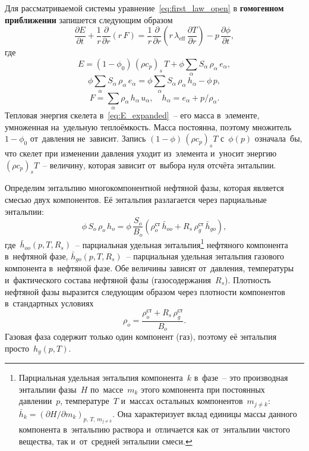 \documentclass[12pt,a4paper]{article}
\newcommand{\divr}[1]{\frac{1}{r}\frac{\partial}{\partial r}\!\left(r\,#1\right)}
\newcommand{\pdt}[1]{\frac{\partial #1}{\partial t}}
\newcommand{\pdr}[1]{\frac{\partial #1}{\partial r}}
\newcommand{\leff}{\lambda_{\mathrm{eff}}}
\begin{document}
Для рассматриваемой системы
уравнение~\eqref{eq:first_law_open} в \textbf{гомогенном приближении} запишется следующим образом
\begin{equation}\label{eq:energy_cons}
  \pdt{E}
  + \divr{F}
  = \divr{\leff\,\pdr{T}} - p\,\pdt{\phi},
\end{equation}
где
\begin{equation}\label{eq:E_expanded}
  E = (1 - \phi_0)\,(\rho c_p)_s\,T + \phi\sum_\alpha S_\alpha\,\rho_\alpha\,e_\alpha,
\end{equation}
\begin{equation}\label{eq:E_enthalpy_relation}
\phi\sum_\alpha S_\alpha\,\rho_\alpha\,e_\alpha = \phi\sum_\alpha S_\alpha\,\rho_\alpha\,h_\alpha
      - \phi\,p,
\end{equation}
\begin{equation}\label{eq:F_total}
  F = \sum_\alpha \rho_\alpha\,h_\alpha\,u_\alpha, \quad  h_\alpha = e_\alpha + p/\rho_\alpha.
\end{equation}
Тепловая энергия скелета в~\eqref{eq:E_expanded}~-- его масса
в~элементе, умноженная на~удельную теплоёмкость. Масса постоянна,
поэтому множитель $1 - \phi_0$ от~давления не~зависит. Запись
$(1 - \phi)\,(\rho c_p)_s T$ с~$\phi(p)$ означала~бы, что скелет при
изменении давления уходит из~элемента и~уносит энергию
$(\rho c_p)_s T$~-- величину, которая зависит от~выбора нуля отсчёта
энтальпии.

Определим энтальпию многокомпонентной нефтяной фазы, которая является смесью двух компонентов.
Её энтальпия разлагается через парциальные энтальпии:
\begin{equation}\label{eq:oil_enthalpy_components}
  \phi\,S_o\,\rho_o\,h_o
  = \phi\,\frac{S_o}{B_o}\!\left(
      \rho_o^{\text{ст}}\,\bar{h}_{oo}
      + R_s\,\rho_g^{\text{ст}}\,\bar{h}_{go}
    \right),
\end{equation}
где~$\bar{h}_{oo}(p, T, R_s)$~-- парциальная удельная
энтальпия\footnote{Парциальная удельная энтальпия компонента~$k$
в~фазе~-- это производная энтальпии фазы~$H$ по~массе~$m_k$ этого
компонента при постоянных давлении~$p$, температуре~$T$ и~массах
остальных компонентов~$m_{j\neq k}$:
$\bar{h}_k = (\partial H/\partial m_k)_{p,\,T,\,m_{j\neq k}}$.
Она характеризует вклад единицы массы данного компонента в~энтальпию
раствора и~отличается как от~энтальпии чистого вещества, так и~от~средней
энтальпии смеси.} нефтяного компонента в~нефтяной фазе,
$\bar{h}_{go}(p, T, R_s)$~-- парциальная удельная энтальпия газового
компонента в~нефтяной фазе. Обе величины зависят от~давления,
температуры и~фактического состава нефтяной фазы (газосодержания~$R_s$).
Плотность нефтяной фазы выразится следующим образом через плотности компонентов в~стандартных условиях
\begin{equation}\label{eq:rho_oil}
  \rho_o = \frac{\rho_o^{\text{ст}} + R_s\,\rho_g^{\text{ст}}}{B_o}.
\end{equation}
Газовая фаза содержит только один компонент (газ), поэтому её энтальпия
просто~$h_g(p,T)$.
\end{document}
